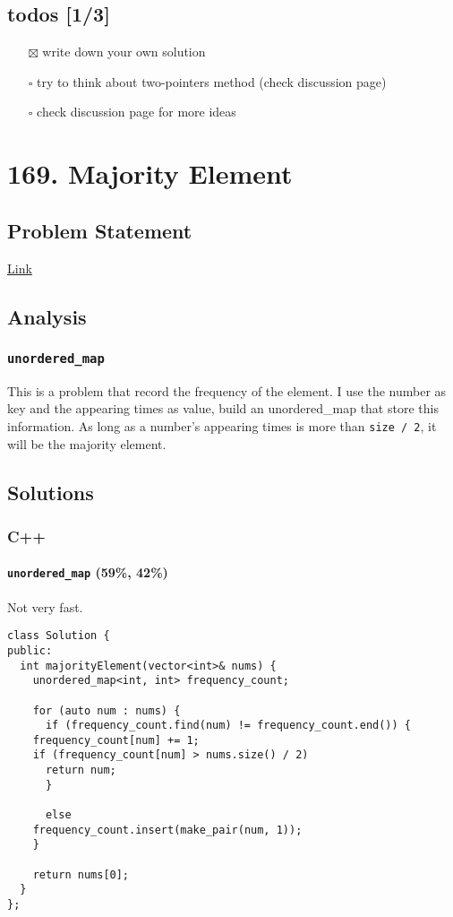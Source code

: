 \documentclass[11pt]{article}
\begin{document}
\subsection{todos [1/3]}
\label{sec:org9330730}
\begin{itemize}
\item[{$\boxtimes$}] write down your own solution
\item[{$\square$}] try to think about two-pointers method (check discussion page)
\item[{$\square$}] check discussion page for more ideas
\end{itemize}
\section{169. Majority Element}
\label{sec:orgb1c9161}
\subsection{Problem Statement}
\label{sec:orga57a4af}
\href{https://leetcode.com/problems/majority-element/}{Link}
\subsection{Analysis}
\label{sec:org6aaea6a}
\subsubsection{\texttt{unordered\_map}}
\label{sec:orgf98ffbc}
This is a problem that record the frequency of the element. I use the number as key and the appearing times as value, build an unordered\_map that store this information. As long as a number's appearing times is more than \texttt{size / 2}, it will be the majority element.
\subsection{Solutions}
\label{sec:org7453cfc}
\subsubsection{C++}
\label{sec:orgd529f7d}
\paragraph{\texttt{unordered\_map} (59\%, 42\%)}
\label{sec:org58fa1a5}
Not very fast.
\begin{verbatim}
class Solution {
public:
  int majorityElement(vector<int>& nums) {
    unordered_map<int, int> frequency_count;

    for (auto num : nums) {
      if (frequency_count.find(num) != frequency_count.end()) {
	frequency_count[num] += 1;
	if (frequency_count[num] > nums.size() / 2)
	  return num;
      }

      else
	frequency_count.insert(make_pair(num, 1));
    }

    return nums[0];
  }
};
\end{verbatim}
\end{document}
